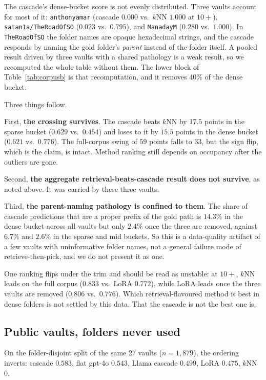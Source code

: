 \documentclass[11pt]{article}
\begin{document}
The cascade's dense-bucket score is not evenly distributed.
Three vaults account for most of it: \texttt{anthonyamar} (cascade $0.000$ vs.\ $k$NN $1.000$ at $10{+}$), \texttt{satan1a/TheRoadOfSO} ($0.023$ vs.\ $0.795$), and \texttt{ManadayM} ($0.280$ vs.\ $1.000$).
In \texttt{TheRoadOfSO} the folder names are opaque hexadecimal strings, and the cascade responds by naming the gold folder's \emph{parent} instead of the folder itself.
A pooled result driven by three vaults with a shared pathology is a weak result, so we recomputed the whole table without them.
The lower block of Table~\ref{tab:corpusb} is that recomputation, and it removes $40\%$ of the dense bucket.

Three things follow.

First, \textbf{the crossing survives}.
The cascade beats $k$NN by $17.5$ points in the sparse bucket ($0.629$ vs.\ $0.454$) and loses to it by $15.5$ points in the dense bucket ($0.621$ vs.\ $0.776$).
The full-corpus swing of $59$ points falls to $33$, but the sign flip, which is the claim, is intact.
Method ranking still depends on occupancy after the outliers are gone.

Second, \textbf{the aggregate retrieval-beats-cascade result does not survive}, as noted above.
It was carried by these three vaults.

Third, \textbf{the parent-naming pathology is confined to them}.
The share of cascade predictions that are a proper prefix of the gold path is $14.3\%$ in the dense bucket across all vaults but only $2.4\%$ once the three are removed, against $6.7\%$ and $2.6\%$ in the sparse and mid buckets.
So this is a data-quality artifact of a few vaults with uninformative folder names, not a general failure mode of retrieve-then-pick, and we do not present it as one.

One ranking flips under the trim and should be read as unstable: at $10{+}$, $k$NN leads on the full corpus ($0.833$ vs.\ LoRA $0.772$), while LoRA leads once the three vaults are removed ($0.806$ vs.\ $0.776$).
Which retrieval-flavoured method is best in dense folders is not settled by this data.
That the cascade is not the best one is.

\subsection{Public vaults, folders never used}

On the folder-disjoint split of the same 27 vaults ($n{=}1{,}879$), the ordering inverts: cascade $0.583$, flat gpt-4o $0.543$, Llama cascade $0.499$, LoRA $0.475$, $k$NN $0$.
\end{document}
